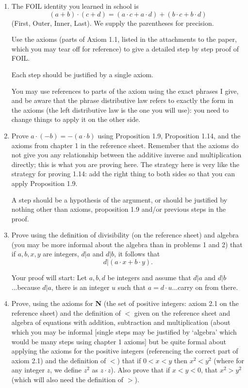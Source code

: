 \documentclass[12pt]{article}
\begin{document}
\begin{enumerate}

\item The FOIL identity you learned in school is $$(a+b)\cdot(c+d) = (a\cdot c + a \cdot d) + (b \cdot c + b \cdot d)$$ (First, Outer, Inner, Last).  We supply the parentheses for precision.  

Use the axioms (parts of Axiom 1.1, listed in the attachments to the paper, which you may tear off for reference) to give a detailed step by step proof of FOIL.  

Each step should be justified by a single axiom.  

You may use references to parts of the axiom using the exact phrases I give, and be aware that the phrase distributive law refers to exactly the form in the axioms (the left distributive law is the one you will use):  you need to change things to apply it on the other side.

\newpage

\item  Prove $a \cdot (-b) = -(a\cdot b)$ using Proposition 1.9,  Proposition 1.14,  and the axioms from chapter 1 in the reference sheet.  Remember that the axioms do not give you any relationship between the additive inverse and multiplication directly;  this is what you are proving here.  The strategy here is very like the strategy for proving 1.14: add the right thing to both sides so that you can apply Proposition 1.9.

A step should be a hypothesis of the argument, or should be justified by nothing other than axioms, proposition 1.9 and/or previous steps in the proof.

\newpage

\item Prove using the definition of divisibility (on the reference sheet) and algebra (you may be more informal about the algebra than in problems 1 and  2) that if $a,b,x,y$ are integers, $d|a$ and $d|b$, it follows that $$d|(a\cdot x+b\cdot y).$$

Your proof will start:  Let $a,b,d$ be integers and assume that $d|a$ and $d|b$...because $d|a$, there is an integer $u$ such that $a=d\cdot u$...carry on from there.

\newpage

\item Prove, using the axioms for {\bf N} (the set of positive integers:  axiom 2.1 on the reference sheet) and the definition of $<$ given on the reference sheet and algebra of equations with addition, subtraction and multiplication (about which you may be informal [single steps may be justified by `algebra' which would be many steps using chapter 1 axioms] but be quite formal about applying the axioms for the positive integers (referencing the correct part of axiom 2.1) and the definition of $<$) that if $0<x<y$ then $x^2 < y^2$ (where for any integer $z$, we define
$z^2$ as $z \cdot z$).  Also prove that if $x<y<0$, that $x^2 > y^2$ (which will also need the definition of $>$).


\end{enumerate}
\end{document}
